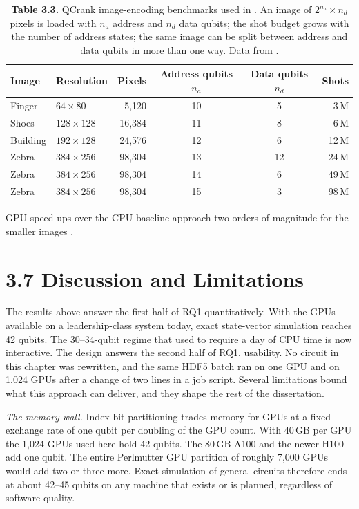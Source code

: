 \documentclass{report}
\theoremstyle{plain}
\theoremstyle{definition}
\theoremstyle{remark}
\begin{document}
\begin{table}[htbp]
\caption{\textbf{Table 3.3.} QCrank image-encoding benchmarks used in \cite{guo2025qgear}. An image of $2^{n_{a}}\times n_{d}$ pixels is loaded with $n_{a}$ address and $n_{d}$ data qubits; the shot budget grows with the number of address states; the same image can be split between address and data qubits in more than one way. Data from \cite{guo2025qgear}.}
\label{tab:qgear:qcrank}
 \small

\begin{tabular}{llrccr}
\toprule
Image & Resolution & Pixels & Address qubits $n_{a}$ & Data qubits $n_{d}$ & Shots \\
\midrule
Finger   & $64\times 80$   & 5,120  & 10 & 5  & 3\,M \\
Shoes    & $128\times 128$ & 16,384 & 11 & 8  & 6\,M \\
Building & $192\times 128$ & 24,576 & 12 & 6  & 12\,M \\
Zebra    & $384\times 256$ & 98,304 & 13 & 12 & 24\,M \\
Zebra    & $384\times 256$ & 98,304 & 14 & 6  & 49\,M \\
Zebra    & $384\times 256$ & 98,304 & 15 & 3  & 98\,M \\
\bottomrule
\end{tabular}
\begin{tablenotes}
GPU speed-ups over the CPU baseline approach two orders of magnitude for the smaller images \cite{guo2025qgear}.
\end{tablenotes}

\end{table}

\section{3.7 Discussion and Limitations}\label{sec:qgear:discussion}

The results above answer the first half of RQ1 quantitatively. With the GPUs available on a leadership-class system today, exact state-vector simulation reaches 42 qubits. The 30--34-qubit regime that used to require a day of CPU time is now interactive. The design answers the second half of RQ1, usability. No circuit in this chapter was rewritten, and the same HDF5 batch ran on one GPU and on 1,024 GPUs after a change of two lines in a job script. Several limitations bound what this approach can deliver, and they shape the rest of the dissertation.

\emph{The memory wall.} Index-bit partitioning trades memory for GPUs at a fixed exchange rate of one qubit per doubling of the GPU count. With 40 GB per GPU the 1,024 GPUs used here hold 42 qubits. The 80 GB A100 and the newer H100 add one qubit. The entire Perlmutter GPU partition of roughly 7,000 GPUs would add two or three more. Exact simulation of general circuits therefore ends at about 42--45 qubits on any machine that exists or is planned, regardless of software quality.
\end{document}
